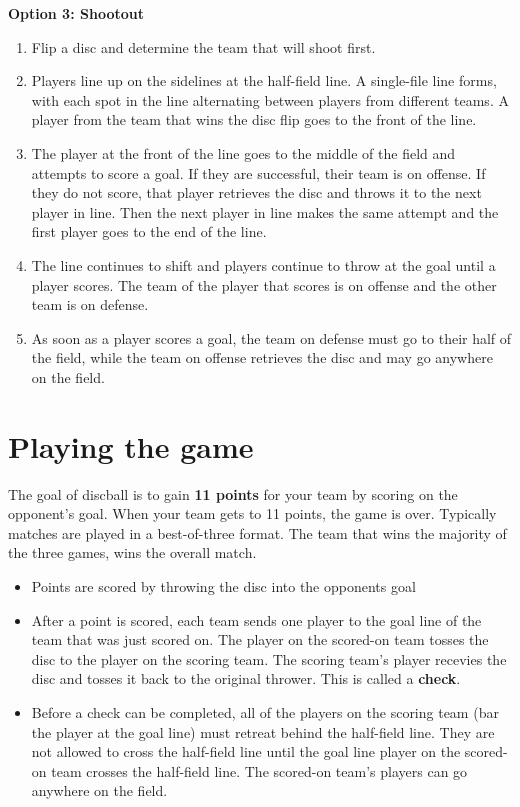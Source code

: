 \documentclass[10pt]{article}
\begin{document}
\textbf{Option 3: Shootout}
\begin{enumerate}
    \item Flip a disc and determine the team that will shoot first.
    \item Players line up on the sidelines at the half-field line. A single-file line forms, with each spot in the line alternating between players from different teams. A player from the team that wins the disc flip goes to the front of the line.
    \item The player at the front of the line goes to the middle of the field and attempts to score a goal. If they are successful, their team is on offense. If they do not score, that player retrieves the disc and throws it to the next player in line. Then the next player in line makes the same attempt and the first player goes to the end of the line.
    \item The line continues to shift and players continue to throw at the goal until a player scores. The team of the player that scores is on offense and the other team is on defense.
    \item As soon as a player scores a goal, the team on defense must go to their half of the field, while the team on offense retrieves the disc and may go anywhere on the field.
\end{enumerate}

\section{Playing the game}

The goal of discball is to gain \textbf{11 points} for your team by scoring on the opponent's goal. When your team gets to 11 points, the game is over. Typically matches are played in a best-of-three format. The team that wins the majority of the three games, wins the overall match.
\begin{itemize}
    \item Points are scored by throwing the disc into the opponents goal
    \item After a point is scored, each team sends one player to the goal line of the team that was just scored on. The player on the scored-on team tosses the disc to the player on the scoring team. The scoring team's player recevies the disc and tosses it back to the original thrower. This is called a \textbf{check}.
    \item Before a check can be completed, all of the players on the scoring team (bar the player at the goal line) must retreat behind the half-field line. They are not allowed to cross the half-field line until the goal line player on the scored-on team crosses the half-field line. The scored-on team's players can go anywhere on the field.
\end{itemize}
\end{document}
